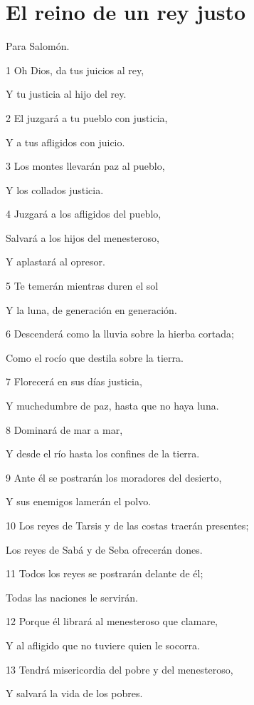 \section*{El reino de un rey justo}

\par Para Salomón.

\par 1 Oh Dios, da tus juicios al rey,
\par Y tu justicia al hijo del rey.
\par 2 El juzgará a tu pueblo con justicia,
\par Y a tus afligidos con juicio.
\par 3 Los montes llevarán paz al pueblo,
\par Y los collados justicia.
\par 4 Juzgará a los afligidos del pueblo,
\par Salvará a los hijos del menesteroso,
\par Y aplastará al opresor.
\par 5 Te temerán mientras duren el sol
\par Y la luna, de generación en generación.
\par 6 Descenderá como la lluvia sobre la hierba cortada;
\par Como el rocío que destila sobre la tierra.
\par 7 Florecerá en sus días justicia,
\par Y muchedumbre de paz, hasta que no haya luna.
\par 8 Dominará de mar a mar,
\par Y desde el río hasta los confines de la tierra. 
\par 9 Ante él se postrarán los moradores del desierto,
\par Y sus enemigos lamerán el polvo.
\par 10 Los reyes de Tarsis y de las costas traerán presentes;
\par Los reyes de Sabá y de Seba ofrecerán dones.
\par 11 Todos los reyes se postrarán delante de él;
\par Todas las naciones le servirán.
\par 12 Porque él librará al menesteroso que clamare,
\par Y al afligido que no tuviere quien le socorra.
\par 13 Tendrá misericordia del pobre y del menesteroso,
\par Y salvará la vida de los pobres.

